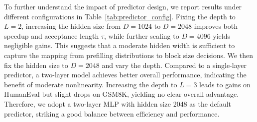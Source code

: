 \documentclass{llmxive}
\providecommand{\arraystretch}{1.15}
\begin{document}
\begin{table}[t]
\vspace{-8pt}
\centering
\scriptsize
\setlength{\tabcolsep}{3.2pt}
\renewcommand{\arraystretch}{1.03}
\vspace{-8pt}

\caption{Speedup and acceptance length ($\tau$) under different predictor configurations.}
\label{tab:predictor_config}
\end{table}

To further understand the impact of predictor design, we report results under different configurations in Table~\ref{tab:predictor_config}. Fixing the depth to $L=2$, increasing the hidden size from $D=1024$ to $D=2048$ improves both speedup and acceptance length $\tau$, while further scaling to $D=4096$ yields negligible gains. This suggests that a moderate hidden width is sufficient to capture the mapping from prefilling distributions to block size decisions. We then fix the hidden size to $D=2048$ and vary the depth. Compared to a single-layer predictor, a two-layer model achieves better overall performance, indicating the benefit of moderate nonlinearity. Increasing the depth to $L=3$ leads to gains on HumanEval but slight drops on GSM8K, yielding no clear overall advantage. Therefore, we adopt a two-layer MLP with hidden size 2048 as the default predictor, striking a good balance between efficiency and performance.
\end{document}
